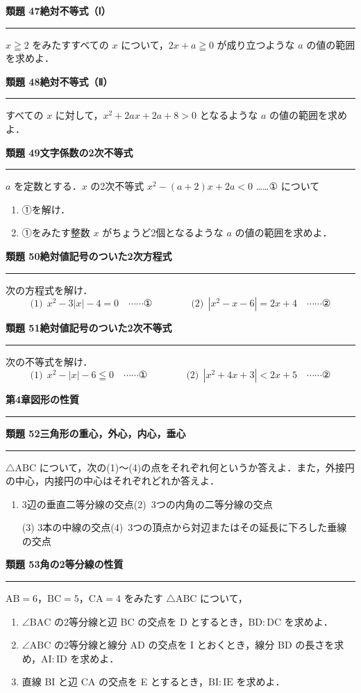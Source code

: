 \documentclass[a4paper,11pt]{ltjsarticle}
\newcommand{\mon}[2]{\Needspace{7\baselineskip}\vspace{10pt}%
  {\sffamily\bfseries 類題 #1\quad #2\par}\vspace{2pt}\hrule\vspace{4pt}}
\newcommand{\shou}[2]{\clearpage\markboth{#1\quad #2}{}%
  {\sffamily\bfseries\LARGE #1\quad #2\par}\vspace{2pt}\hrule height 1.2pt\vspace{4pt}}
\begin{document}
\mon{47}{絶対不等式（Ⅰ）}
$x\geqq2$ をみたすすべての $x$ について，$2x+a\geqq0$ が成り立つような $a$ の値の範囲を求めよ．

\mon{48}{絶対不等式（Ⅱ）}
すべての $x$ に対して，$x^2+2ax+2a+8>0$ となるような $a$ の値の範囲を求めよ．

\mon{49}{文字係数の2次不等式}
$a$ を定数とする．$x$ の2次不等式 $x^2-(a+2)x+2a<0$ ……① について
\begin{enumerate}
\item ①を解け．
\item ①をみたす整数 $x$ がちょうど2個となるような $a$ の値の範囲を求めよ．
\end{enumerate}

\mon{50}{絶対値記号のついた2次方程式}
次の方程式を解け．
\[\text{(1)}\ \ x^2-3|x|-4=0\quad\cdots\cdots\text{①}\qquad\qquad\text{(2)}\ \ |x^2-x-6|=2x+4\quad\cdots\cdots\text{②}\]

\mon{51}{絶対値記号のついた2次不等式}
次の不等式を解け．
\[\text{(1)}\ \ x^2-|x|-6\leqq0\quad\cdots\cdots\text{①}\qquad\qquad\text{(2)}\ \ |x^2+4x+3|<2x+5\quad\cdots\cdots\text{②}\]

\shou{第4章}{図形の性質}
\mon{52}{三角形の重心，外心，内心，垂心}
$\triangle\mathrm{ABC}$ について，次の(1)〜(4)の点をそれぞれ何というか答えよ．また，外接円の中心，内接円の中心はそれぞれどれか答えよ．
\begin{enumerate}
\item 3辺の垂直二等分線の交点\qquad (2)\ 3つの内角の二等分線の交点
\item[(3)] 3本の中線の交点\qquad (4)\ 3つの頂点から対辺またはその延長に下ろした垂線の交点
\end{enumerate}

\mon{53}{角の2等分線の性質}
$\mathrm{AB}=6$，$\mathrm{BC}=5$，$\mathrm{CA}=4$ をみたす $\triangle\mathrm{ABC}$ について，
\begin{enumerate}
\item $\angle\mathrm{BAC}$ の2等分線と辺 BC の交点を D とするとき，$\mathrm{BD}:\mathrm{DC}$ を求めよ．
\item $\angle\mathrm{ABC}$ の2等分線と線分 AD の交点を I とおくとき，線分 BD の長さを求め，$\mathrm{AI}:\mathrm{ID}$ を求めよ．
\item 直線 BI と辺 CA の交点を E とするとき，$\mathrm{BI}:\mathrm{IE}$ を求めよ．
\end{enumerate}
\end{document}
